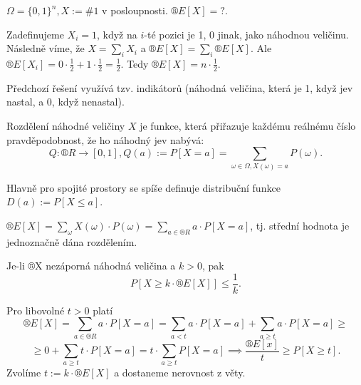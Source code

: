 \documentclass[12pt]{article}					%
\begin{document}

    \begin{priklad}
        $\Omega = \{0, 1\}^n, X := \#1$ v posloupnosti. $®E[X] = ?$.

        \begin{reseni}
            Zadefinujeme $X_i = 1$, když na $i$-té pozici je 1, 0 jinak, jako náhodnou veličinu. Následně víme, že $X = \sum_i X_i$ a $®E[X] = \sum_i ®E[X]$. Ale $®E[X_i] = 0·\frac{1}{2} + 1·\frac{1}{2} = \frac{1}{2}$. Tedy $®E[X] = n·\frac{1}{2}$.
        \end{reseni}
    \end{priklad}

    \begin{poznamka}
        Předchozí řešení využívá tzv. indikátorů (náhodná veličina, která je 1, když jev nastal, a 0, když nenastal).
    \end{poznamka}

    \begin{definice}[Rozdělení]
        Rozdělení náhodné veličiny $X$ je funkce, která přiřazuje každému reálnému číslo pravděpodobnost, že ho náhodný jev nabývá:
        $$ Q: ®R \rightarrow [0, 1], Q(a) := P[X=a] = \sum_{\omega \in \Omega, X(\omega) = a} P(\omega). $$ 

        Hlavně pro spojité prostory se spíše definuje distribuční funkce $D(a) := P[X ≤ a]$.
    \end{definice}

    \begin{poznamka}
        $®E[X] = \sum_\omega X(\omega)·P(\omega) = \sum_{a \in ®R} a·P[X=a]$, tj. střední hodnota je jednoznačně dána rozdělením.
    \end{poznamka}

    \begin{veta}
        Je-li ®X nezáporná náhodná veličina a $k > 0$, pak
        $$ P[X ≥ k·®E[X]] ≤ \frac{1}{k}. $$ 
        
        \begin{dukazin}
            Pro libovolné $t > 0$ platí
            $$ ®E[X] = \sum_{a \in ®R} a·P[X=a] = \sum_{a<t} a·P[X=a] + \sum_{a≥t}a·P[X=a] ≥ $$
            $$ ≥ 0 + \sum_{a≥t} t·P[X=a] = t·\sum_{a≥t} P[X=a] \implies \frac{®E[x]}{t} ≥ P[X ≥ t]. $$ 
            Zvolíme $t := k·®E[X]$ a dostaneme nerovnost z věty.
        \end{dukazin}
    \end{veta}
\end{document}
